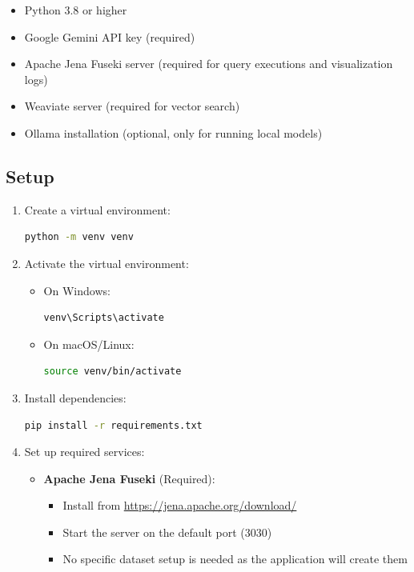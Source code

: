 \begin{itemize}
    \item Python 3.8 or higher
    \item Google Gemini API key (required)
    \item Apache Jena Fuseki server (required for query executions and visualization logs)
    \item Weaviate server (required for vector search)
    \item Ollama installation (optional, only for running local models)
\end{itemize}

\subsection*{Setup}

\begin{enumerate}
    \item Create a virtual environment:
    \begin{lstlisting}[language=bash]
python -m venv venv
    \end{lstlisting}

    \item Activate the virtual environment:
    \begin{itemize}
        \item On Windows:
        \begin{lstlisting}[language=bash]
venv\Scripts\activate
        \end{lstlisting}
        \item On macOS/Linux:
        \begin{lstlisting}[language=bash]
source venv/bin/activate
        \end{lstlisting}
    \end{itemize}

    \item Install dependencies:
    \begin{lstlisting}[language=bash]
pip install -r requirements.txt
    \end{lstlisting}

    \item Set up required services:
    \begin{itemize}
        \item \textbf{Apache Jena Fuseki} (Required):
        \begin{itemize}
            \item Install from \url{https://jena.apache.org/download/}
            \item Start the server on the default port (3030)
            \item No specific dataset setup is needed as the application will create them
        \end{itemize}


\end{itemize}
\end{enumerate}
